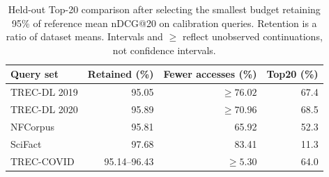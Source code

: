 \begin{table}[t]
\centering
\caption{Held-out Top-20 comparison after selecting the smallest budget retaining 95\% of reference mean nDCG@20 on calibration queries. Retention is a ratio of dataset means. Intervals and $\geq$ reflect unobserved continuations, not confidence intervals.}
\label{tab:quality}
\small
\setlength{\tabcolsep}{3pt}
\begin{tabular}{lrrr}
\toprule
Query set & Retained (\%) & Fewer accesses (\%) & Top20 (\%) \\
\midrule
TREC-DL 2019 & 95.05 & $\geq 76.02$ & 67.4 \\
TREC-DL 2020 & 95.89 & $\geq 70.96$ & 68.5 \\
NFCorpus & 95.81 & 65.92 & 52.3 \\
SciFact & 97.68 & 83.41 & 11.3 \\
TREC-COVID & 95.14--96.43 & $\geq 5.30$ & 64.0 \\
\bottomrule
\end{tabular}
\end{table}
